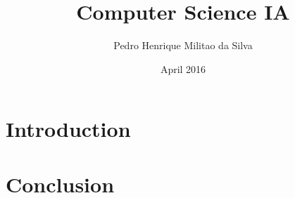 \documentclass{article}
\title{Computer Science IA}
\author{Pedro Henrique Militao da Silva }
\date{April 2016}
\begin{document}
\maketitle

\section{Introduction}




\section{Conclusion}





\end{document}
